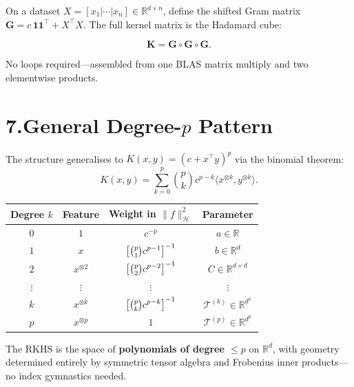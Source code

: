 \documentclass[11pt]{article}
\begin{document}
On a dataset $X=[x_1|\cdots|x_n]\in\mathbb{R}^{d\times n}$, define the
shifted Gram matrix $\mathbf{G}=c\,\mathbf{1}\mathbf{1}^\top+X^\top X$.
The full kernel matrix is the Hadamard cube:
\begin{mathbox}
\[
  \mathbf{K} = \mathbf{G}\circ\mathbf{G}\circ\mathbf{G}.
\]
\end{mathbox}
No loops required---assembled from one BLAS matrix multiply and two
elementwise products.

\section*{7.\quad General Degree-$p$ Pattern}

The structure generalises to $K(x,y)=(c+x^\top y)^p$ via the binomial
theorem:
\[
  K(x,y)
  =\sum_{k=0}^{p}\binom{p}{k}c^{p-k}
    \langle x^{\otimes k},y^{\otimes k}\rangle.
\]

\medskip
\begin{center}
\begin{tabular}{cccc}
\toprule
Degree $k$ & Feature & Weight in $\|f\|_{\mathcal{H}}^2$ & Parameter \\
\midrule
$0$ & $1$ & $c^{-p}$ & $a\in\mathbb{R}$ \\[2pt]
$1$ & $x$ & $\displaystyle\left[\tbinom{p}{1}c^{p-1}\right]^{-1}$ & $b\in\mathbb{R}^d$ \\[8pt]
$2$ & $x^{\otimes 2}$ & $\displaystyle\left[\tbinom{p}{2}c^{p-2}\right]^{-1}$ & $C\in\mathbb{R}^{d\times d}$ \\[8pt]
$\vdots$ & $\vdots$ & $\vdots$ & $\vdots$ \\[2pt]
$k$ & $x^{\otimes k}$ & $\displaystyle\left[\tbinom{p}{k}c^{p-k}\right]^{-1}$ & $\mathcal{T}^{(k)}\in\mathbb{R}^{d^k}$ \\[8pt]
$p$ & $x^{\otimes p}$ & $1$ & $\mathcal{T}^{(p)}\in\mathbb{R}^{d^p}$ \\
\bottomrule
\end{tabular}
\end{center}

\medskip
The RKHS is the space of \textbf{polynomials of degree $\leq p$} on
$\mathbb{R}^d$, with geometry determined entirely by symmetric tensor
algebra and Frobenius inner products---no index gymnastics needed.
\end{document}
